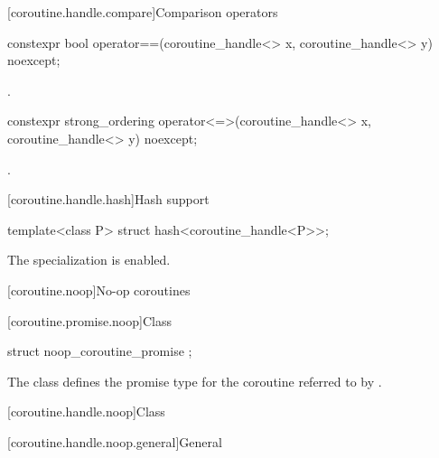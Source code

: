 [coroutine.handle.compare]{Comparison operators}

%
%
\begin{itemdecl}
constexpr bool operator==(coroutine_handle<> x, coroutine_handle<> y) noexcept;
\end{itemdecl}

\begin{itemdescr}
\pnum
\returns
{}.
\end{itemdescr}

%
\begin{itemdecl}
constexpr strong_ordering operator<=>(coroutine_handle<> x, coroutine_handle<> y) noexcept;
\end{itemdecl}

\begin{itemdescr}
\pnum
\returns
{}.
\end{itemdescr}

[coroutine.handle.hash]{Hash support}

%
\begin{itemdecl}
template<class P> struct hash<coroutine_handle<P>>;
\end{itemdecl}

\begin{itemdescr}
\pnum
The specialization is enabled.
\end{itemdescr}

[coroutine.noop]{No-op coroutines}

[coroutine.promise.noop]{Class }

%
\begin{itemdecl}
struct noop_coroutine_promise {};
\end{itemdecl}

\begin{itemdescr}
\pnum
The class  defines the promise type for
the coroutine referred to
by .
\end{itemdescr}

[coroutine.handle.noop]{Class }

[coroutine.handle.noop.general]{General}

